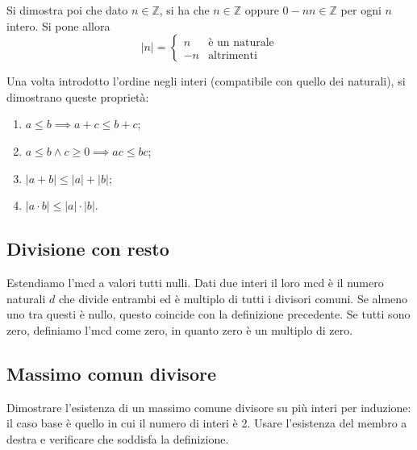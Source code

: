 \documentclass[a4paper]{article}
\begin{document}
Si dimostra poi che dato \(n \in \mathbb{Z}\), si ha che
\(n\in\mathbb{Z}\) oppure \(0-n n\in\mathbb{Z}\) per ogni \(n\) intero.
Si pone allora
\[
    |n| = \begin{cases}
        n & \text{è un naturale} \\
        -n & \text{altrimenti}
    \end{cases}
\]

Una volta introdotto l'ordine negli interi (compatibile con quello dei naturali),
si dimostrano queste proprietà:
\begin{enumerate}
    \item \(a \leq b \implies a+c \leq b+c\);
    \item \(a \leq b \land c \geq 0 \implies ac \leq bc\);
    \item \(|a+b| \leq |a| + |b|\);
    \item \(|a\cdot b| \leq |a|\cdot|b|\).
\end{enumerate}

\subsection{Divisione con resto}

Estendiamo l'mcd a valori tutti nulli.
Dati due interi il loro mcd è il numero naturali
\(d\) che divide entrambi ed è multiplo di tutti i divisori comuni.
Se almeno uno tra questi è nullo, questo coincide con la definizione precedente.
Se tutti sono zero, definiamo l'mcd come zero, in quanto zero è un multiplo di zero.

\subsection{Massimo comun divisore}

Dimostrare l'esistenza di un massimo comune divisore su più interi
per induzione: il caso base è quello in cui il numero di interi è 2.
Usare l'esistenza del membro a destra e verificare che soddisfa la definizione.

\end{document}
